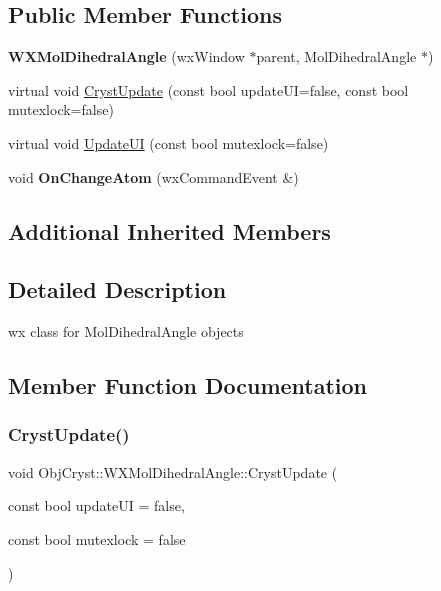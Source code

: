 \subsection*{Public Member Functions}
\begin{DoxyCompactItemize}
\item 
\mbox{\label{class_obj_cryst_1_1_w_x_mol_dihedral_angle_a7824312068845db4bac2aac7f36e0546}} 
{\bfseries W\+X\+Mol\+Dihedral\+Angle} (wx\+Window $\ast$parent, Mol\+Dihedral\+Angle $\ast$)
\item 
virtual void \mbox{\hyperlink{class_obj_cryst_1_1_w_x_mol_dihedral_angle_a5bd5d650acff2a6a749bab3842044b02}{Cryst\+Update}} (const bool update\+UI=false, const bool mutexlock=false)
\item 
virtual void \mbox{\hyperlink{class_obj_cryst_1_1_w_x_mol_dihedral_angle_a6c959c830c79de8bdc253088c5593b5f}{Update\+UI}} (const bool mutexlock=false)
\item 
\mbox{\label{class_obj_cryst_1_1_w_x_mol_dihedral_angle_a7aedda600fad925e9a6bcf15d882f555}} 
void {\bfseries On\+Change\+Atom} (wx\+Command\+Event \&)
\end{DoxyCompactItemize}
\subsection*{Additional Inherited Members}


\subsection{Detailed Description}
wx class for Mol\+Dihedral\+Angle objects 

\subsection{Member Function Documentation}
\mbox{\label{class_obj_cryst_1_1_w_x_mol_dihedral_angle_a5bd5d650acff2a6a749bab3842044b02}} 
\subsubsection{\texorpdfstring{CrystUpdate()}{CrystUpdate()}}
{\footnotesize\ttfamily void Obj\+Cryst\+::\+W\+X\+Mol\+Dihedral\+Angle\+::\+Cryst\+Update (\begin{DoxyParamCaption}\item[{const bool}]{update\+UI = {\ttfamily false},  }\item[{const bool}]{mutexlock = {\ttfamily false} }\end{DoxyParamCaption})\hspace{0.3cm}{\ttfamily [virtual]}}

